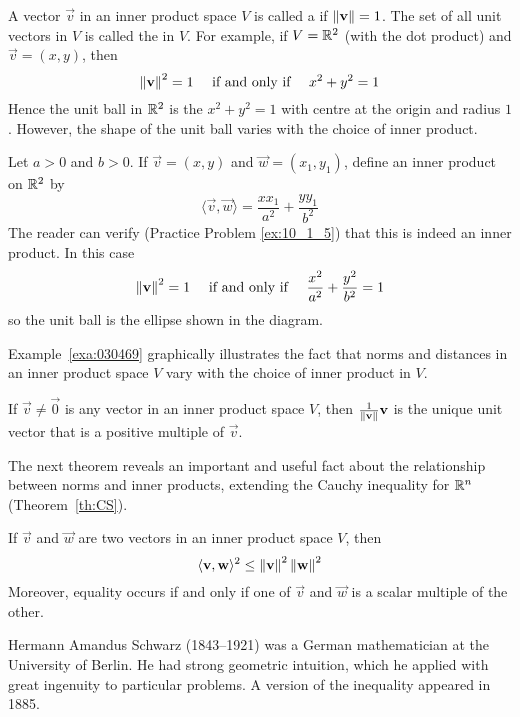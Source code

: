 \documentclass{ximera}
\begin{document}
A vector $\vec{v}$ in an inner product space $V$ is called a  if $\left\lVert\mathbf{v}\right\rVert = 1$. The set of all unit vectors in $V$ is called the  in $V$. For example, if $V = \mathbb{R}^2$ (with the dot product) and $\vec{v} = (x, y)$, then
\begin{equation*}
\left\lVert \mathbf{v} \right\rVert^2 = 1 \quad \mbox{ if and only if } \quad x^2 + y^2 = 1
\end{equation*}
Hence the unit ball in $\mathbb{R}^2$ is the  $x^{2} + y^{2} = 1$ with centre at the origin and radius $1$. However, the shape of the unit ball varies with the choice of inner product.

\begin{example}\label{exa:030469}


Let $a > 0$ and $b > 0$. If $\vec{v} = (x, y)$ and $\vec{w} = (x_{1}, y_{1})$, define an inner product on $\mathbb{R}^2$ by
\begin{equation*}
\langle \vec{v}, \vec{w} \rangle = \frac{xx_1}{a^2} + \frac{yy_1}{b^2}
\end{equation*}
The reader can verify (Practice Problem \ref{ex:10_1_5}) that this is indeed an inner product. In this case
\begin{equation*}
\left\lVert \mathbf{v} \right\rVert^2 = 1 \quad \mbox{ if and only if } \quad \frac{x^2}{a^2} + \frac{y^2}{b^2} = 1
\end{equation*}
so the unit ball is the ellipse shown in the diagram.
\end{example}

Example~\ref{exa:030469} graphically illustrates the fact that norms and distances in an inner product space $V$ vary with the choice of inner product in $V$.

\begin{theorem}\label{030480}
If $\vec{v} \neq \vec{0}$ is any vector in an inner product space $V$, then $\frac{1}{\left\lVert \mathbf{v} \right\rVert} \mathbf{v}$ is the unique unit vector that is a positive multiple of $\vec{v}$.
\end{theorem}

The next theorem reveals an important and useful fact about the relationship between norms and inner products, extending the Cauchy inequality for $\mathbb{R}^n$ (Theorem~\ref{th:CS}).

\begin{theorem}\label{030486}
If $\vec{v}$ and $\vec{w}$ are two vectors in an inner product space $V$, then
\begin{equation*}
\langle \mathbf{v}, \mathbf{w} \rangle^2 \leq \left\lVert \mathbf{v} \right\rVert^2 \left\lVert \mathbf{w} \right\rVert^2
\end{equation*}
Moreover, equality occurs if and only if one of $\vec{v}$ and $\vec{w}$ is a scalar multiple of the other.
\end{theorem}
\begin{remark}
   Hermann Amandus Schwarz (1843--1921) was a German mathematician at the University of Berlin. He had strong geometric intuition, which he applied with great ingenuity to particular problems. A version of the inequality appeared in 1885. 
\end{remark}
\end{document}
